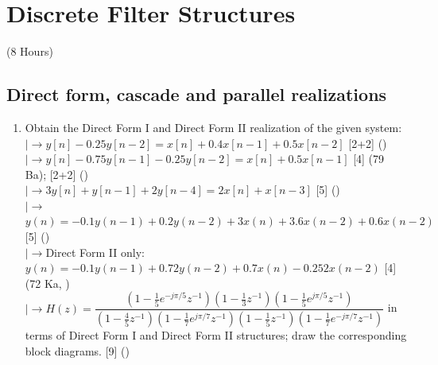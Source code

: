 \documentclass[12pt]{article}
\newcommand{\lb}{\\$\left|\rightarrow\right.$}
\begin{document}
\pagebreak
\section{Discrete Filter Structures}
\begin{center}(8 Hours)\end{center}

  \subsection{Direct form, cascade and parallel realizations}
    \begin{enumerate}[topsep=0pt, noitemsep]
      \item Obtain the Direct Form I and Direct Form II realization of the given system:
        \lb $y[n]-0.25y[n-2]=x[n]+0.4x[n-1]+0.5x[n-2]$ \hfill [2+2] ()
        \lb $y[n]-0.75y[n-1]-0.25y[n-2]=x[n]+0.5x[n-1]$ \hfill [4] (79 Ba); \hfill [2+2] ()
        \lb $3y[n]+y[n-1]+2y[n-4]=2x[n]+x[n-3]$ \hfill [5] ()
        \lb $y(n)=-0.1y(n-1)+0.2y(n-2)+3x(n)+3.6x(n-2)+0.6x(n-2)$ \hfill [5] ()
        \lb Direct Form II only: $y(n)=-0.1y(n-1)+0.72y(n-2)+0.7x(n)-0.252x(n-2)$ \hfill [4] (72 Ka, )
        \lb $H(z)=\dfrac{(1-\tfrac15 e^{-j\pi/5}z^{-1})(1-\tfrac13 z^{-1})(1-\tfrac15 e^{j\pi/5}z^{-1})}{(1-\tfrac45 z^{-1})(1-\tfrac17 e^{j\pi/7}z^{-1})(1-\tfrac15 z^{-1})(1-\tfrac17 e^{-j\pi/7}z^{-1})}$ in terms of Direct Form I and Direct Form II structures; draw the corresponding block diagrams. \hfill [9] ()


\end{enumerate}
\end{document}

